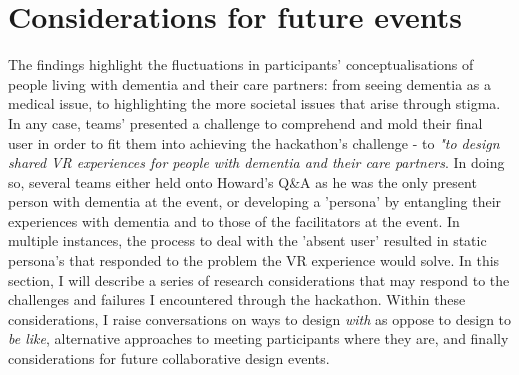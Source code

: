 \section{Considerations for future events}
\label{sec:ConsdierationsEvent}
The findings highlight the fluctuations in participants' conceptualisations of people living with dementia and their care partners: from seeing dementia as a medical issue, to highlighting the more societal issues that arise through stigma. In any case, teams' presented a challenge to comprehend and mold their final user in order to fit them into achieving the hackathon's challenge - to \textit{"to design shared VR experiences for people with dementia and their care partners}. In doing so, several teams either held onto Howard's Q\&A as he was the only present person with dementia at the event, or developing a 'persona' by entangling their experiences with dementia and to those of the facilitators at the event. In multiple instances, the process to deal with the 'absent user' resulted in static persona's that responded to the problem the VR experience would solve. In this section, I will describe a series of research considerations that may respond to the challenges and failures I encountered through the hackathon. Within these considerations, I raise conversations on ways to design \textit{with} as oppose to design to \textit{be like}, alternative approaches to meeting participants where they are, and finally considerations for future collaborative design events. 

